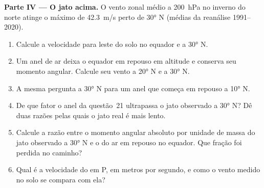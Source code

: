 \begin{problem}
\medskip
\noindent\textbf{Parte IV --- O jato acima.} O vento zonal médio a \qty{200}{hPa} no inverno do norte
atinge o máximo de \qty{42.3}{m/s} perto de \ang{30} N (médias da reanálise 1991--2020).
\begin{enumerate}[resume]
  \item Calcule a velocidade para leste do solo no equador e a \ang{30} N.
  \item Um anel de ar deixa o equador em repouso em altitude e conserva seu momento angular. Calcule seu
        vento a \ang{20} N e a \ang{30} N.
  \item A mesma pergunta a \ang{30} N para um anel que começa em repouso a \ang{10} N.
  \item De que fator o anel da questão~21 ultrapassa o jato observado a \ang{30} N? Dê duas razões pelas
        quais o jato real é mais lento.
  \item Calcule a razão entre o momento angular absoluto por unidade de massa do jato observado a
        \ang{30} N e o do ar em repouso no equador. Que fração foi perdida no caminho?
  \item Qual é a velocidade do  em P, em metros por segundo, e como o vento medido no
        solo se compara com ela?
\end{enumerate}
\end{problem}
